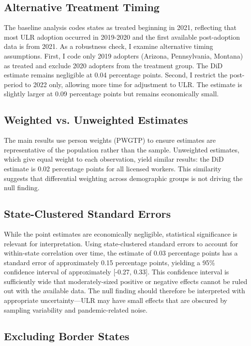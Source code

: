 \documentclass[12pt]{article}
\begin{document}
\subsection{Alternative Treatment Timing}

The baseline analysis codes states as treated beginning in 2021, reflecting that most ULR adoption occurred in 2019-2020 and the first available post-adoption data is from 2021. As a robustness check, I examine alternative timing assumptions. First, I code only 2019 adopters (Arizona, Pennsylvania, Montana) as treated and exclude 2020 adopters from the treatment group. The DiD estimate remains negligible at 0.04 percentage points. Second, I restrict the post-period to 2022 only, allowing more time for adjustment to ULR. The estimate is slightly larger at 0.09 percentage points but remains economically small.

\subsection{Weighted vs. Unweighted Estimates}

The main results use person weights (PWGTP) to ensure estimates are representative of the population rather than the sample. Unweighted estimates, which give equal weight to each observation, yield similar results: the DiD estimate is 0.02 percentage points for all licensed workers. This similarity suggests that differential weighting across demographic groups is not driving the null finding.

\subsection{State-Clustered Standard Errors}

While the point estimates are economically negligible, statistical significance is relevant for interpretation. Using state-clustered standard errors to account for within-state correlation over time, the estimate of 0.03 percentage points has a standard error of approximately 0.15 percentage points, yielding a 95\% confidence interval of approximately [-0.27, 0.33]. This confidence interval is sufficiently wide that moderately-sized positive or negative effects cannot be ruled out with the available data. The null finding should therefore be interpreted with appropriate uncertainty---ULR may have small effects that are obscured by sampling variability and pandemic-related noise.

\subsection{Excluding Border States}
\end{document}

